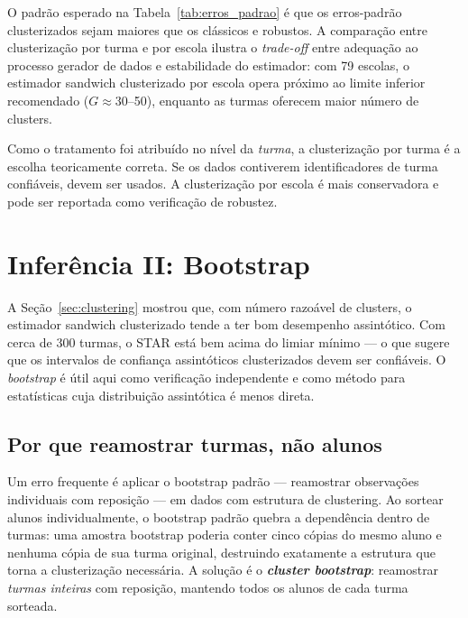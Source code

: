 O padrão esperado na Tabela~\ref{tab:erros_padrao} é que os erros-padrão clusterizados sejam maiores que os clássicos e robustos. A comparação entre clusterização por turma e por escola ilustra o \textit{trade-off} entre adequação ao processo gerador de dados e estabilidade do estimador: com 79 escolas, o estimador sandwich clusterizado por escola opera próximo ao limite inferior recomendado ($G \approx 30$--50), enquanto as turmas oferecem maior número de clusters.

\begin{notabox}
Como o tratamento foi atribuído no nível da \textit{turma}, a clusterização por turma é a escolha teoricamente correta. Se os dados contiverem identificadores de turma confiáveis, devem ser usados. A clusterização por escola é mais conservadora e pode ser reportada como verificação de robustez.
\end{notabox}


\section{Inferência II: Bootstrap}
\label{sec:star_bootstrap}

A Seção~\ref{sec:clustering} mostrou que, com número razoável de clusters, o estimador sandwich clusterizado tende a ter bom desempenho assintótico. Com cerca de 300 turmas, o STAR está bem acima do limiar mínimo --- o que sugere que os intervalos de confiança assintóticos clusterizados devem ser confiáveis. O \textit{bootstrap} é útil aqui como verificação independente e como método para estatísticas cuja distribuição assintótica é menos direta.

\subsection*{Por que reamostrar turmas, não alunos}

Um erro frequente é aplicar o bootstrap padrão --- reamostrar observações individuais com reposição --- em dados com estrutura de clustering. Ao sortear alunos individualmente, o bootstrap padrão quebra a dependência dentro de turmas: uma amostra bootstrap poderia conter cinco cópias do mesmo aluno e nenhuma cópia de sua turma original, destruindo exatamente a estrutura que torna a clusterização necessária. A solução é o \textbf{\textit{cluster bootstrap}}: reamostrar \textit{turmas inteiras} com reposição, mantendo todos os alunos de cada turma sorteada.

